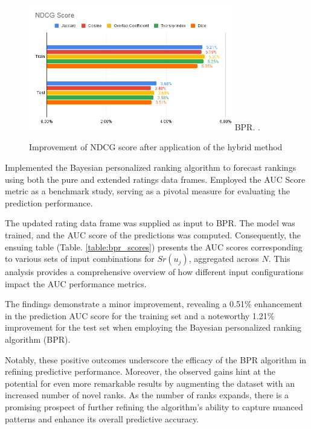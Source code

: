 \documentclass[journal]{IEEEtran}
\begin{document}
  \begin{figure}[!t]
  \centering
  \includegraphics[width=3.5in]{picture/BPR-NDCG-Score.png}
  BPR.
  \DeclareGraphicsExtensions.
  \caption{Improvement of NDCG score after application of the hybrid method}
  \label{fig:bpr_ndcg}
  \end{figure}

Implemented the Bayesian personalized ranking \cite{rendle2012bpr} algorithm to forecast rankings using both the pure and extended ratings data frames. 
Employed the AUC Score metric as a benchmark study, serving as a pivotal measure for evaluating the prediction performance.

The updated rating data frame was supplied as input to BPR. The model was trained, and the AUC score of the predictions was 
computed. Consequently, the ensuing table (Table. \ref{table:bpr_scores}) presents the AUC scores corresponding to various sets of input combinations for  
\(Sr(u_j)\), aggregated across \(N\). This analysis provides a comprehensive overview of how different input configurations 
impact the AUC performance metrics.

The findings demonstrate a minor improvement, revealing a 0.51\% enhancement in the prediction AUC score for the training set and a 
noteworthy 1.21\% improvement for the test set when employing the Bayesian personalized ranking algorithm (BPR). 

Notably, these positive outcomes underscore the efficacy of the BPR algorithm in refining predictive performance. Moreover, 
the observed gains hint at the potential for even more remarkable results by augmenting the dataset with an increased number 
of novel ranks. As the number of ranks expands, there is a promising prospect of further refining the algorithm's ability 
to capture nuanced patterns and enhance its overall predictive accuracy.
\end{document}
